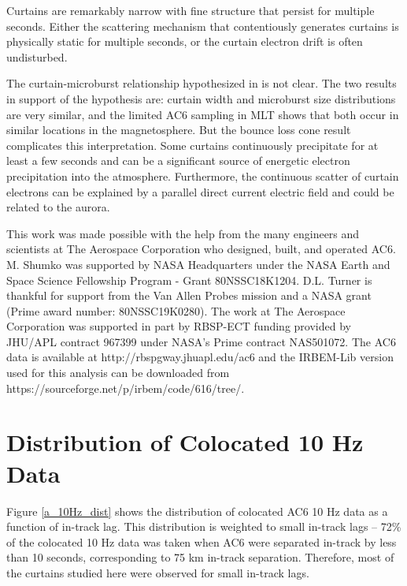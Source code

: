 \documentclass[draft]{agujournal2019}
\begin{document}
Curtains are remarkably narrow with fine structure that persist for multiple seconds. Either the scattering mechanism that contentiously generates curtains is physically static for multiple seconds, or the curtain electron drift is often undisturbed. 

The curtain-microburst relationship hypothesized in  is not clear. The two results in support of the hypothesis are: curtain width and microburst size distributions are very similar, and the limited AC6 sampling in MLT shows that both occur in similar locations in the magnetosphere. But the bounce loss cone result complicates this interpretation. Some curtains continuously precipitate for at least a few seconds and can be a significant source of energetic electron precipitation into the atmosphere. Furthermore, the continuous scatter of curtain electrons can be explained by a parallel direct current electric field and could be related to the aurora.


\acknowledgments
This work was made possible with the help from the many engineers and scientists at The Aerospace Corporation who designed, built, and operated AC6. M. Shumko was supported by NASA Headquarters under the NASA Earth and Space Science Fellowship Program - Grant 80NSSC18K1204. D.L. Turner is thankful for support from the Van Allen Probes mission and a NASA grant (Prime award number: 80NSSC19K0280). The work at The Aerospace Corporation was supported in part by RBSP-ECT funding provided by JHU/APL contract 967399 under NASA's Prime contract NAS501072. The AC6 data is available at http://rbspgway.jhuapl.edu/ac6 and the IRBEM-Lib version used for this analysis can be downloaded from https://sourceforge.net/p/irbem/code/616/tree/.

\appendix

\section{Distribution of Colocated 10 Hz Data}
Figure \ref{a_10Hz_dist} shows the distribution of colocated AC6 10 Hz data as a function of in-track lag. This distribution is weighted to small in-track lags -- 72\% of the colocated 10 Hz data was taken when AC6 were separated in-track by less than 10 seconds, corresponding to 75 km in-track separation. Therefore, most of the curtains studied here were observed for small in-track lags.
\end{document}

